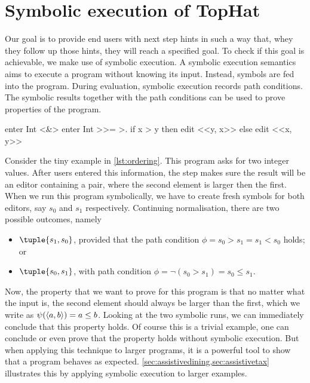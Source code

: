 
\section{Symbolic execution of TopHat}
\label{sec:symbolic}

Our goal is to provide end users with next step hints in such a way that, whey they follow up those hints, they will reach a specified goal.
To check if this goal is achievable, we make use of symbolic execution.
A symbolic execution semantics~\cite{King1975,Boyer1975} aims to execute a program without knowing its input.
Instead, symbols are fed into the program.
During evaluation, symbolic execution records path conditions.
The symbolic results together with the path conditions can be used to prove properties of the program.

\begin{TASK}[
    float=ht,
    caption={Ordering of tuple elements.},
    captionpos=b,
    label=lst:ordering]
  enter Int <&> enter Int >>= >. if x > y then edit <<y, x>> else edit <<x, y>>
\end{TASK}

Consider the tiny example in \cref{lst:ordering}.
This program asks for two integer values.
After users entered this information, the step makes sure the result will be an editor containing a pair,
where the second element is larger then the first.
When we run this program symbolically, we have to create fresh symbols for both editors, say $s_0$ and $s_1$ respectively.
Continuing normalisation, there are two possible outcomes, namely
\begin{itemize}
  \item $\tuple{s_1,s_0}$, provided that the path condition $\phi = s_0 > s_1 = s_1 < s_0$ holds; or
  \item $\tuple{s_0,s_1}$, with path condition $\phi = \lnot (s_0 > s_1) = s_0 \leq s_1$.
\end{itemize}

Now, the property that we want to prove for this program is that no matter what the input is, the second element should always be larger than the first,
which we write as $\psi(\langle a, b\rangle)= a \leq b$.
Looking at the two symbolic runs, we can immediately conclude that this property holds.
Of course this is a trivial example, one can conclude or even prove that the property holds without symbolic execution.
But when applying this technique to larger programs, it is a powerful tool to show that a program behaves as expected.
\cref{sec:assistivedining,sec:assistivetax} illustrates this by applying symbolic execution to larger examples.

